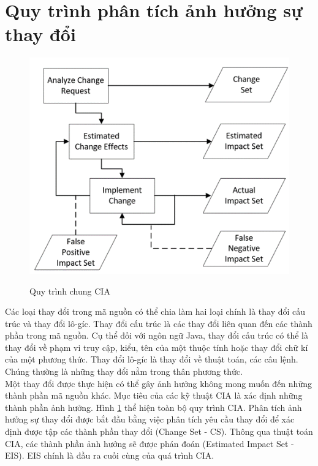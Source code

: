 \documentclass[12pt]{report}
\begin{document}
\section{Quy trình phân tích ảnh hưởng sự thay đổi}
\begin{figure}[h]
	\centering
	\includegraphics[scale=0.8]{CIA-process}
	\label{fig:cia-process}
	\caption{Quy trình chung CIA}
\end{figure}

Các loại thay đổi trong mã nguồn có thể chia làm hai loại chính là thay đổi cấu trúc và thay đổi lô-gíc. Thay đổi cấu trúc là các thay đổi liên quan đến các thành phần trong mã nguồn. Cụ thể đối với ngôn ngữ Java, thay đổi cấu trúc có thể là thay đổi về phạm vi truy cập, kiểu, tên của một thuộc tính hoặc thay đổi chữ kí của một phương thức. Thay đổi lô-gíc là thay đổi về thuật toán, các câu lệnh. Chúng thường là những thay đổi nằm trong thân phương thức.\\

Một thay đổi được thực hiện có thể gây ảnh hưởng không mong muốn đến những thành phần mã nguồn khác. Mục tiêu của các kỹ thuật CIA là xác định những thành phần ảnh hưởng. Hình \ref{fig:cia-process} thể hiện toàn bộ quy trình CIA. Phân tích ảnh hưởng sự thay đổi được bắt đầu bằng việc phân tích yêu cầu thay đổi để xác định được tập các thành phần thay đổi (Change Set - CS). Thông qua thuật toán CIA, các thành phần ảnh hưởng sẽ được phán đoán (Estimated Impact Set - EIS). EIS chính là đầu ra cuối cùng của quá trình CIA.\\
\end{document}
